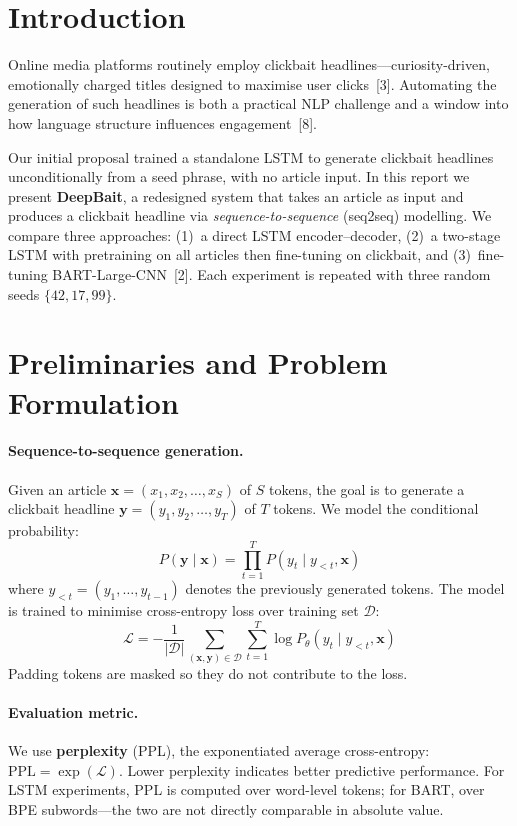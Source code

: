 \documentclass{article}
\begin{document}
\section{Introduction}

Online media platforms routinely employ clickbait headlines---curiosity-driven, emotionally charged titles designed to maximise user clicks~[3].
Automating the generation of such headlines is both a practical NLP challenge and a window into how language structure influences engagement~[8].

Our initial proposal trained a standalone LSTM to generate clickbait headlines unconditionally from a seed phrase, with no article input.
In this report we present \textbf{DeepBait}, a redesigned system that takes an article as input and produces a clickbait headline via \emph{sequence-to-sequence} (seq2seq) modelling.
We compare three approaches:
(1)~a direct LSTM encoder--decoder,
(2)~a two-stage LSTM with pretraining on all articles then fine-tuning on clickbait, and
(3)~fine-tuning BART-Large-CNN~[2].
Each experiment is repeated with three random seeds $\{42, 17, 99\}$.


\section{Preliminaries and Problem Formulation}

\paragraph{Sequence-to-sequence generation.}
Given an article $\mathbf{x} = (x_1, x_2, \ldots, x_S)$ of $S$ tokens, the goal is to generate a clickbait headline $\mathbf{y} = (y_1, y_2, \ldots, y_T)$ of $T$ tokens.
We model the conditional probability:
\[
P(\mathbf{y} \mid \mathbf{x}) = \prod_{t=1}^{T} P(y_t \mid y_{<t}, \mathbf{x})
\]
where $y_{<t} = (y_1, \ldots, y_{t-1})$ denotes the previously generated tokens.
The model is trained to minimise cross-entropy loss over training set $\mathcal{D}$:
\vspace{-2mm}
\[
\mathcal{L} = -\frac{1}{|\mathcal{D}|} \sum_{(\mathbf{x}, \mathbf{y}) \in \mathcal{D}} \sum_{t=1}^{T} \log P_\theta(y_t \mid y_{<t}, \mathbf{x})
\]
Padding tokens are masked so they do not contribute to the loss.

\paragraph{Evaluation metric.}
We use \textbf{perplexity} (PPL), the exponentiated average cross-entropy: $\text{PPL} = \exp(\mathcal{L})$.
Lower perplexity indicates better predictive performance.
For LSTM experiments, PPL is computed over word-level tokens; for BART, over BPE subwords---the two are not directly comparable in absolute value.
\end{document}
